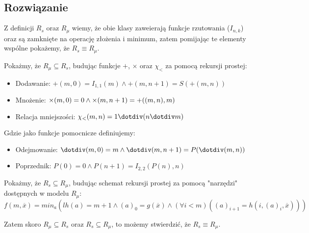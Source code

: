 \documentclass[12pt]{article}
\begin{document}
\newpage

\subsection*{Rozwiązanie}
    Z definicji $R_s$ oraz $R_\mu$ wiemy, że obie klasy zaweierają funkcje rzutowania ($I_{n,k}$) oraz są zamknięte na operację złożenia i minimum, zatem pomijając te elementy wspólne pokażemy, że $R_s \equiv R_\mu$.

    \noindent \newline

    \noindent Pokażmy, że $R_\mu \subseteq R_s$, budując funkcje $+$, $\times$ oraz $\chi_<$ za pomocą rekursji prostej:
    \begin{itemize}
        \item Dodawanie: $+(m, 0) = I_{1,1}(m) \land +(m, n + 1) = S(+(m, n))$
        \item Mnożenie: $\times(m, 0) = 0 \land \times(m, n + 1) = +(\AddToHookNextWithArguments{hook}{code}(m, n), m)$
        \item Relacja mniejszości: $\chi_<(m, n) = 1 \dotdiv (n \dotdiv m)$
    \end{itemize}

    \noindent Gdzie jako funkcje pomocnicze definiujemy:
    \begin{itemize}
        \item Odejmowanie: $\dotdiv(m, 0) = m \land \dotdiv(m, n + 1) = P(\dotdiv(m, n))$
        \item Poprzednik: $P(0) = 0 \land P(n + 1) = I_{2,2}(P(n), n)$
    \end{itemize}

    \noindent \newline

    \noindent Pokażmy, że $R_s \subseteq R_\mu$, budując schemat rekursji prostej za pomocą "narzędzi" dostępnych w modelu $R_\mu$:
    $$
    f(m, \overline{x}) = min_a(lh(a) = m + 1 \land (a)_0 = g(\overline{x}) \land (\forall i < m)((a)_{i + 1} = h(i, (a)_i, \overline{x})))
    $$

    \noindent \newline

    \noindent Zatem skoro $R_\mu \subseteq R_s$ oraz $R_s \subseteq R_\mu$, to możemy stwierdzić, że $R_s \equiv R_\mu$. \qedsymbol
\end{document}
